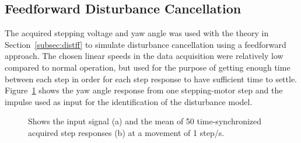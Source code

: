 \subsection{Feedforward Disturbance Cancellation}\label{sec:hc}
The acquired stepping voltage and yaw angle was used with the theory in Section~\ref{subsec:distff} to simulate disturbance cancellation using a feedforward approach. The chosen linear speeds in the data acquisition were relatively low compared to normal operation, but used for the purpose of getting enough time between each step in order for each step response to have sufficient time to settle. Figure~\ref{fig:stepinout} shows the yaw angle response from one stepping-motor step and the impulse used as input for the identification of the disturbance model.

\begin{figure}[h!]
  \centering %
  \qquad
  \caption{\label{fig:stepinout} Shows the input signal (a) and the mean of 50 time-synchronized acquired step responses (b) at a movement of 1 step/s.}
\end{figure}

